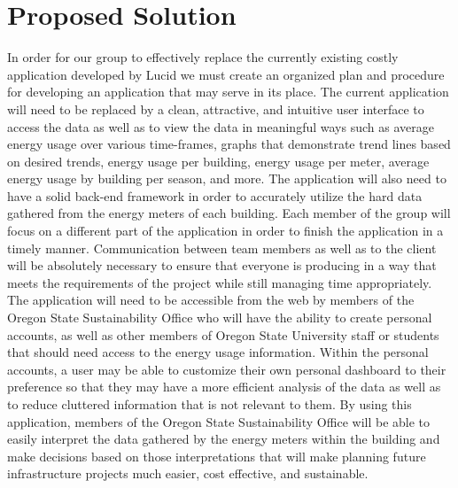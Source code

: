 \documentclass[onecolumn, draftclsnofoot,10pt, compsoc]{IEEEtran}
\begin{document}
\section{Proposed Solution}
	In order for our group to effectively replace the currently existing costly application developed by Lucid we must create an organized plan and procedure
	for developing an application that may serve in its place. The current application will need to be replaced by a clean, attractive, and intuitive user interface to access the 
	data as well as to view the data in meaningful ways such as average energy usage over various time-frames, graphs that demonstrate trend lines based on
	desired trends, energy usage per building, energy usage per meter, average energy usage by building per season, and more. The application will also need to 
	have a solid back-end framework in order to accurately utilize the hard data gathered from the energy meters of each building. Each member of the group
	will focus on a different part of the application in order to finish the application in a timely manner. Communication between team members 
	as well as to the client will be absolutely necessary to ensure that everyone is producing in a way that meets the requirements of the project while 
	still managing time appropriately. The application will need to be accessible from the web by members of the Oregon State Sustainability Office who 
	will have the ability to create personal accounts, as well as other members of Oregon State University staff or students that should need access to the
	energy usage information. Within the personal accounts, a user may be able to customize their own personal dashboard to their preference so that they
	may have a more efficient analysis of the data as well as to reduce cluttered information that is not relevant to them. By using this application, members of 
	the Oregon State Sustainability Office will be able to easily interpret the data gathered by the energy meters within the building and make decisions based on
	those interpretations that will make planning future infrastructure projects much easier, cost effective, and sustainable. 
	
\end{document}

